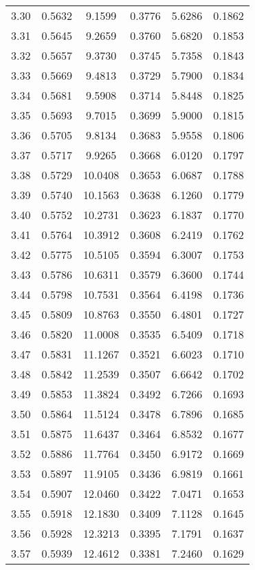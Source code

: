 \documentclass{article}
\begin{document}
\begin{longtable}{cccccc}
3.30 & 0.5632 & 9.1599 & 0.3776 & 5.6286 & 0.1862 \\
3.31 & 0.5645 & 9.2659 & 0.3760 & 5.6820 & 0.1853 \\
3.32 & 0.5657 & 9.3730 & 0.3745 & 5.7358 & 0.1843 \\
3.33 & 0.5669 & 9.4813 & 0.3729 & 5.7900 & 0.1834 \\
3.34 & 0.5681 & 9.5908 & 0.3714 & 5.8448 & 0.1825 \\
3.35 & 0.5693 & 9.7015 & 0.3699 & 5.9000 & 0.1815 \\
3.36 & 0.5705 & 9.8134 & 0.3683 & 5.9558 & 0.1806 \\
3.37 & 0.5717 & 9.9265 & 0.3668 & 6.0120 & 0.1797 \\
3.38 & 0.5729 & 10.0408 & 0.3653 & 6.0687 & 0.1788 \\
3.39 & 0.5740 & 10.1563 & 0.3638 & 6.1260 & 0.1779 \\
3.40 & 0.5752 & 10.2731 & 0.3623 & 6.1837 & 0.1770 \\
3.41 & 0.5764 & 10.3912 & 0.3608 & 6.2419 & 0.1762 \\
3.42 & 0.5775 & 10.5105 & 0.3594 & 6.3007 & 0.1753 \\
3.43 & 0.5786 & 10.6311 & 0.3579 & 6.3600 & 0.1744 \\
3.44 & 0.5798 & 10.7531 & 0.3564 & 6.4198 & 0.1736 \\
3.45 & 0.5809 & 10.8763 & 0.3550 & 6.4801 & 0.1727 \\
3.46 & 0.5820 & 11.0008 & 0.3535 & 6.5409 & 0.1718 \\
3.47 & 0.5831 & 11.1267 & 0.3521 & 6.6023 & 0.1710 \\
3.48 & 0.5842 & 11.2539 & 0.3507 & 6.6642 & 0.1702 \\
3.49 & 0.5853 & 11.3824 & 0.3492 & 6.7266 & 0.1693 \\
3.50 & 0.5864 & 11.5124 & 0.3478 & 6.7896 & 0.1685 \\
3.51 & 0.5875 & 11.6437 & 0.3464 & 6.8532 & 0.1677 \\
3.52 & 0.5886 & 11.7764 & 0.3450 & 6.9172 & 0.1669 \\
3.53 & 0.5897 & 11.9105 & 0.3436 & 6.9819 & 0.1661 \\
3.54 & 0.5907 & 12.0460 & 0.3422 & 7.0471 & 0.1653 \\
3.55 & 0.5918 & 12.1830 & 0.3409 & 7.1128 & 0.1645 \\
3.56 & 0.5928 & 12.3213 & 0.3395 & 7.1791 & 0.1637 \\
3.57 & 0.5939 & 12.4612 & 0.3381 & 7.2460 & 0.1629 \\

\end{longtable}
\end{document}
